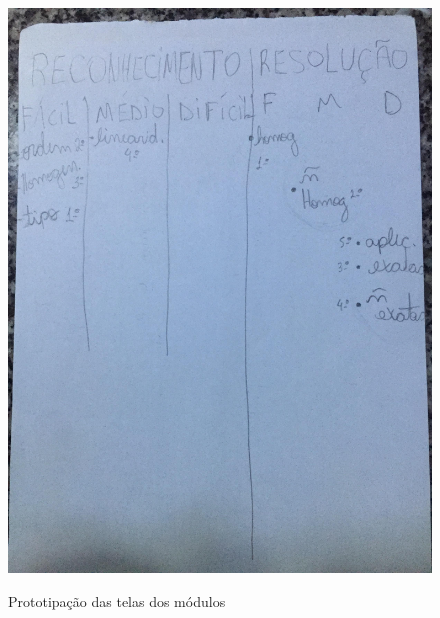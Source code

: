 \begin{figure}[H]
\centering
\caption{Prototipação das telas dos módulos}
\includegraphics[scale=0.0783]{figuras/prot1.jpg}
\label{prot1}
\end{figure}
